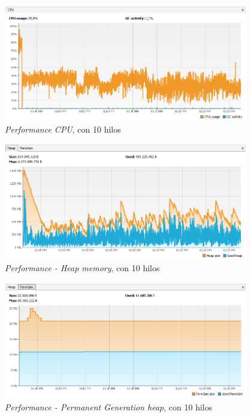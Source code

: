 \begin{figure}[H]
\centering
\includegraphics[width=0.95\textwidth]{images/Performance_CPU_10_Threads}
\caption{\emph{Performance CPU}, con 10 hilos}
\label{fig:6.18}
\end{figure}

\begin{figure}[H]
\centering
\includegraphics[width=0.95\textwidth]{images/Performance_HEAP_10_Threads}
\caption{\emph{Performance - Heap memory}, con 10 hilos}
\label{fig:6.19}
\end{figure}

\begin{figure}[H]
\centering
\includegraphics[width=0.95\textwidth]{images/Performance_PERM_10_Threads}
\caption{\emph{Performance - Permanent Generation heap}, con 10 hilos}
\label{fig:6.20}
\end{figure}

